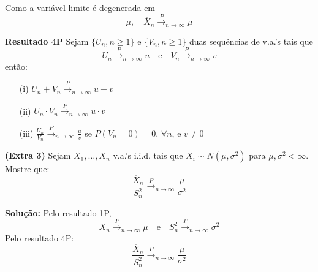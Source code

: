 Como a variável limite é degenerada em
\begin{equation}
\mu, \quad \overline{X}_n \xrightarrow{P}_{n \to \infty} \mu
\end{equation}

\textbf{Resultado 4P} Sejam $\{U_n, n \geq 1\}$ e $\{V_n, n \geq 1\}$ duas sequências de v.a.'s tais que
\begin{equation}
U_n \xrightarrow{P}_{n \to \infty} u \quad \text{e} \quad V_n \xrightarrow{P}_{n \to \infty} v
\end{equation}
então:
\begin{itemize}
    \item[(i)] $U_n + V_n \xrightarrow{P}_{n \to \infty} u + v$
    \item[(ii)] $U_n \cdot V_n \xrightarrow{P}_{n \to \infty} u \cdot v$
    \item[(iii)] $\frac{U_n}{V_n} \xrightarrow{P}_{n \to \infty} \frac{u}{v}$ se $P(V_n = 0) = 0$, $\forall n$, e $v \neq 0$
\end{itemize}

\textbf{(Extra 3)} Sejam $X_1, \ldots, X_n$ v.a.'s i.i.d. tais que $X_i \sim N(\mu, \sigma^2)$ para $\mu, \sigma^2 < \infty$. Mostre que:
\begin{equation}
\frac{\overline{X}_n}{S_n^2} \xrightarrow{P}_{n \to \infty} \frac{\mu}{\sigma^2}
\end{equation}

\textbf{Solução:} Pelo resultado 1P,
\begin{equation}
\overline{X}_n \xrightarrow{P}_{n \to \infty} \mu \quad \text{e} \quad S_n^2 \xrightarrow{P}_{n \to \infty} \sigma^2
\end{equation}
Pelo resultado 4P:
\begin{equation}
\frac{\overline{X}_n}{S_n^2} \xrightarrow{P}_{n \to \infty} \frac{\mu}{\sigma^2}
\end{equation}